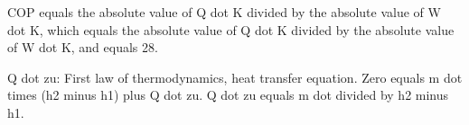 COP equals the absolute value of Q dot K divided by the absolute value of W dot K, which equals the absolute value of Q dot K divided by the absolute value of W dot K, and equals 28.

Q dot zu: First law of thermodynamics, heat transfer equation.  
Zero equals m dot times (h2 minus h1) plus Q dot zu.  
Q dot zu equals m dot divided by h2 minus h1.